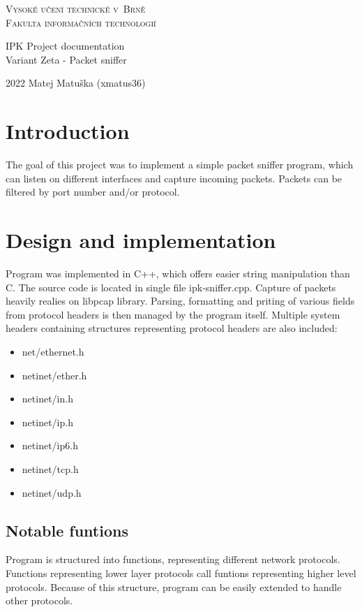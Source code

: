 \documentclass{article}
\begin{document}
\begin{titlepage}
    \begin{center}
        \Huge
        \textsc{Vysoké učení technické v~Brně\\}
        \huge
        \textsc{Fakulta informačních technologií\\}
        \LARGE

        IPK Project documentation\\
        Variant Zeta - Packet sniffer
    \end{center}
{\Large 2022 \hfill Matej Matuška (xmatus36)}
\end{titlepage}

\tableofcontents
\pagebreak

\section{Introduction}
The goal of this project was to implement a simple packet sniffer program, which
can listen on different interfaces and capture incoming packets. Packets can be
filtered by port number and/or protocol.

\section{Design and implementation}
Program was implemented in C++, which offers easier string manipulation than C.
The source code is located in single file ipk-sniffer.cpp.
Capture of packets heavily realies on libpcap library. Parsing, formatting
and priting of various fields from protocol headers is then managed by the
program itself. Multiple system headers containing structures representing
protocol headers are also included:
\begin{itemize}
    \item net/ethernet.h
    \item netinet/ether.h
    \item netinet/in.h
    \item netinet/ip.h
    \item netinet/ip6.h
    \item netinet/tcp.h
    \item netinet/udp.h
\end{itemize}

\subsection{Notable funtions}
Program is structured into functions, representing different network protocols.
Functions representing lower layer protocols call funtions representing higher
level protocols. Because of this structure, program can be easily extended to
handle other protocols.
\end{document}
